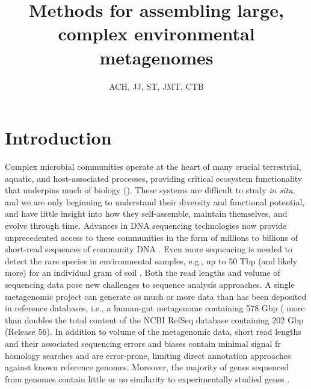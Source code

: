 \documentclass[11pt]{article} %
\begin{document}
\title{Methods for assembling large, complex environmental metagenomes}
\author{ACH, JJ, ST, JMT, CTB} 
\maketitle

\section{Introduction}  
Complex microbial communities operate at the heart of many crucial
terrestrial, aquatic, and host-associated processes, providing
critical ecosystem functionality that underpins much of biology
(\cite{Arumugam:2011p735,Hess:2011p686,Iverson:2012p1281,
  Mackelprang:2011p1087,Qin:2010p189,Tringe:2005p174,Venter:2004p170}).
These systems are difficult to study {\em in situ}, and we are only
beginning to understand their diversity and functional potential, and
have little insight into how they self-assemble, maintain themselves,
and evolve through time.  Advances in DNA sequencing technologies now
provide unprecedented access to these communities in the form of
millions to billions of short-read sequences of community DNA
\cite{Hess:2011p686,Mackelprang:2011p1087,Qin:2010p189}.  Even more
sequencing is needed to detect the rare species in environmental
samples, e.g., up to 50 Tbp (and likely more) for an individual gram
of soil \cite{Gans:2005p1365}.  Both the read lengths and volume of
sequencing data pose new challenges to sequence analysis approaches.
A single metagenomic project can generate as much or more data than
has been deposited in reference databases, i.e., a human-gut
metagenome containing 578 Gbp (\cite{Qin:2010p189} more than doubles
the total content of the NCBI RefSeq database containing 202 Gbp
(Release 56).  In addition to volume of the metagenomic data, short
read lengths and their associated sequencing errors and biases contain
minimal signal fr homology searches and are error-prone, limiting
direct annotation approaches against known reference genomes.  Moreover,
the majority of genes sequenced from genomes contain little or no similarity
to experimentally studied genes
\cite{Arumugam:2011p735,Qin:2010p189}.
\end{document}

